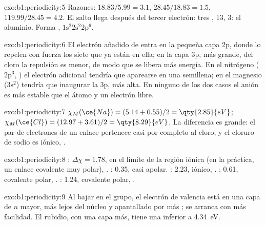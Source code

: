 \begin{solution}{exo:b1:periodicity:5}
Razones: $18.83/5.99 = 3.1$, $28.45/18.83 = 1.5$, $119.99/28.45 = 4.2$.
El salto llega después del tercer electrón: tres ,
 13,  3: el aluminio. Forma , $1\text{s}^2 2\text{s}^2
2\text{p}^6$.
\end{solution}

\begin{solution}{exo:b1:periodicity:6}
El electrón añadido de  entra en la pequeña capa 2p, donde lo
repelen con fuerza los siete  que ya están en ella;
en la capa 3p, más grande, del cloro la repulsión es menor, de modo que se
libera más energía. En el nitrógeno ($2\text{p}^3$, ) el
electrón adicional tendría que aparearse en una  semillena; en el
magnesio ($3\text{s}^2$) tendría que inaugurar la  3p, más alta. En
ninguno de los dos casos el anión es más estable que el átomo y un
electrón libre.
\end{solution}

\begin{solution}{exo:b1:periodicity:7}
$\chi_M(\ce{Na}) = (5.14 + 0.55)/2 = \qty{2.85}{eV}$; $\chi_M(\ce{Cl}) =
(12.97 + 3.61)/2 = \qty{8.29}{eV}$. La diferencia es grande: el par de
electrones de un enlace  pertenece casi por completo al cloro, y
el cloruro de sodio es iónico, .
\end{solution}

\begin{solution}{exo:b1:periodicity:8}
: $\Delta\chi = 1.78$, en el límite de la región iónica (en la
práctica, un enlace covalente muy polar), . : 0.35,
casi apolar. : 2.23, iónico, . : 0.61,
covalente polar, . : 1.24, covalente
polar, .
\end{solution}

\begin{solution}{exo:b1:periodicity:9}
Al bajar en el grupo, el electrón de valencia está en una capa de $n$
mayor, más lejos del núcleo y apantallado por más ; se
arranca con más facilidad. El rubidio, con una capa más, tiene una
 inferior a \qty{4.34}{eV}.
\end{solution}


